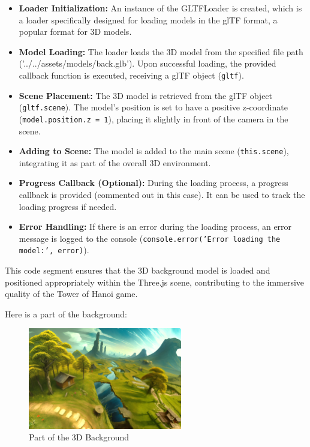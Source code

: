 \documentclass{article}
\begin{document}
\begin{itemize}
    \item \textbf{Loader Initialization:} An instance of the GLTFLoader is created, which is a loader specifically designed for loading models in the glTF format, a popular format for 3D models.

    \item \textbf{Model Loading:} The loader loads the 3D model from the specified file path ('../../assets/models/back.glb'). Upon successful loading, the provided callback function is executed, receiving a glTF object (\texttt{gltf}).

    \item \textbf{Scene Placement:} The 3D model is retrieved from the glTF object (\texttt{gltf.scene}). The model's position is set to have a positive z-coordinate (\texttt{model.position.z = 1}), placing it slightly in front of the camera in the scene.

    \item \textbf{Adding to Scene:} The model is added to the main scene (\texttt{this.scene}), integrating it as part of the overall 3D environment.

    \item \textbf{Progress Callback (Optional):} During the loading process, a progress callback is provided (commented out in this case). It can be used to track the loading progress if needed.

    \item \textbf{Error Handling:} If there is an error during the loading process, an error message is logged to the console (\texttt{console.error('Error loading the model:', error)}).
\end{itemize}

This code segment ensures that the 3D background model is loaded and positioned appropriately within the Three.js scene, contributing to the immersive quality of the Tower of Hanoi game.

Here is a part of the background:
\begin{figure}[h]
    \centering
    \includegraphics[width=0.6\textwidth]{img/back.png}
    \caption{Part of the 3D Background}
    \label{fig:back}
\end{figure}
\end{document}
